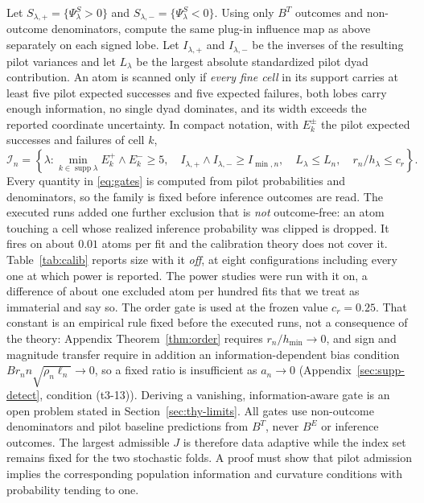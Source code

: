 \documentclass[11pt]{article}
\theoremstyle{definition}
\newcommand{\1}{\mathbf 1}\newcommand{\op}{\operatorname}
\newcommand{\cI}{\mathcal I}\newcommand{\cJ}{\mathcal J}\newcommand{\cF}{\mathcal F}
\begin{document}
Let $S_{\lambda,+}=\{\Psi_\lambda^S>0\}$ and
$S_{\lambda,-}=\{\Psi_\lambda^S<0\}$.  Using only $B^T$ outcomes and
non-outcome denominators, compute the same plug-in influence map as above separately
on each signed lobe.  Let $I_{\lambda,+}$ and $I_{\lambda,-}$ be the inverses of
the resulting pilot variances and let $L_\lambda$ be the largest absolute
standardized pilot dyad contribution.  An atom is scanned only if \emph{every fine cell} in its support carries at
least five pilot expected successes and five expected failures, both lobes
carry enough information, no single dyad dominates, and its width exceeds the
reported coordinate uncertainty.  In compact notation, with $E_{k}^{\pm}$ the
pilot expected successes and failures of cell $k$,
\begin{equation}
 \cI_n=\left\{\lambda:
 \min_{k\in\operatorname{supp}\lambda}E^{+}_{k}\wedge E^{-}_{k}\ge5,\quad
 I_{\lambda,+}\wedge I_{\lambda,-}\ge I_{\min,n},\quad
 L_\lambda\le L_n,\quad
 r_n/h_\lambda\le c_r
 \right\}.                                                         \label{eq:gates}
\end{equation}
Every quantity in \eqref{eq:gates} is computed from pilot probabilities and
denominators, so the family is fixed before inference outcomes are read.  The
executed runs added one further exclusion that is \emph{not} outcome-free: an
atom touching a cell whose realized inference probability was clipped is
dropped.  It fires on about $0.01$ atoms per fit and the calibration theory
does not cover it.  Table~\ref{tab:calib} reports size with it \emph{off},
at eight configurations including every one at which power is reported.  The
power studies were run with it on, a difference of about one excluded atom
per hundred fits that we treat as immaterial and say so.
The order gate is used at the frozen value $c_r=0.25$.  That constant is an
empirical rule fixed before the executed runs, not a consequence of the theory:
Appendix Theorem~\ref{thm:order} requires $r_n/h_{\min}\to0$, and sign and magnitude
transfer require in addition an information-dependent bias condition
$Br_nn\sqrt{\rho_n\ell_n}\to0$, so a fixed ratio is insufficient as $a_n\to0$
(Appendix~\ref{sec:supp-detect}, condition (t3-13)).  Deriving a vanishing, information-aware gate is an open
problem stated in Section~\ref{sec:thy-limits}.  All gates use non-outcome
denominators and pilot baseline predictions from $B^T$,
never $B^E$ or inference outcomes.  The largest admissible $J$ is therefore data
adaptive while the index set remains fixed for the two stochastic folds.  A proof
must show that pilot admission implies the corresponding population information and
curvature conditions with probability tending to one.
\end{document}
